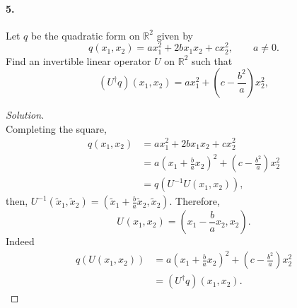 \documentclass{article}
\theoremstyle{plain}
\theoremstyle{definition}
\theoremstyle{remark}
\renewcommand{\Re}{\mathbb{R}}
\begin{document}
    \paragraph{5.}
      Let $q$ be the quadratic form on $\Re^2$ given by
      $$q(x_1,x_2)=ax_1^2+2bx_1x_2 + cx_2^2, \qquad a\neq 0.$$
      Find an invertible linear operator $U$ on $\Re^2$ such that
      $$(U^{\dagger} q)(x_1,x_2) = ax_1^2 + \left(c- \frac{b^2}{a} \right)x_2^2,$$
      \begin{proof}[Solution]$ $\\
        Completing the square,
          \begin{align*}
            q(x_1,x_2)  & = a x_1^2+2bx_1x_2 + cx_2^2\\
                        & = a \left(x_1 + \frac{b}{a}x_2 \right)^2 + \left(c-\frac{b^2}{a}\right)x_2^2\\
                        & = q(U^{-1}U(x_1,x_2)),
          \end{align*}
          then, $U^{-1}(\tilde{x}_1,\tilde{x}_2) =\left( \tilde{x}_1 + \frac{b}{a}\tilde{x}_2, \tilde{x}_2 \right)$. Therefore, $$U^{}({x}_1,{x}_2) =\left( {x}_1 - \frac{b}{a}{x}_2, {x}_2 \right).$$
          Indeed
          \begin{align*}
            q(U(x_1,x_2))  & = a \left(x_1 + \frac{b}{a}x_2 \right)^2 + \left(c-\frac{b^2}{a}\right)x_2^2\\
                        & = (U^{\dagger}q)(x_1,x_2).
          \end{align*}
      \end{proof}
\end{document}
